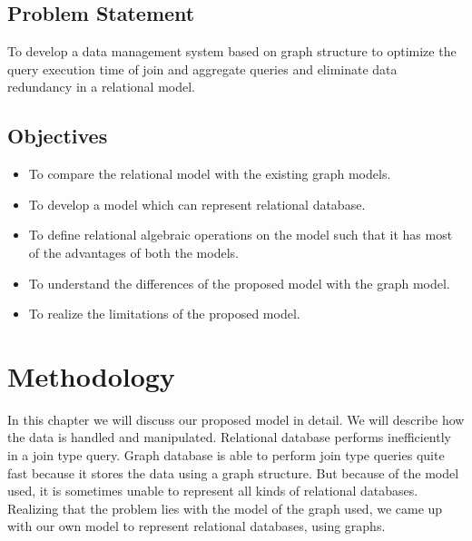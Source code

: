 \documentclass[12pt, oneside]{book}
\begin{document}
\section{Problem Statement}
To develop a data management system based on graph structure to optimize the query execution time of join and aggregate queries and eliminate data redundancy in a relational model.  

\section{Objectives}
\begin{itemize}
 \item To compare the relational model with the existing graph models.
 \item To develop a model which can represent relational database.
 \item To define relational algebraic operations on the model such that it has most of the advantages of both the models.
 \item To understand the differences of the proposed model with the graph model.
 \item To realize the limitations of the proposed model.
\end{itemize}

\chapter{Methodology}
In this chapter we will discuss our proposed model in detail. We will describe how the data is handled and manipulated.
Relational database performs inefficiently in a join type query. Graph database is able to perform join type queries quite fast because it stores the data using a graph structure. But because of the model used, it is sometimes unable to represent all kinds of relational databases. Realizing that the problem lies with the model of the graph used, we came up with our own model to represent relational databases, using graphs.\\ \par
\end{document}
